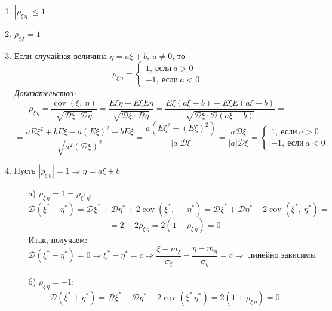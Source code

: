 \documentclass[12pt, a4paper]{article}
\begin{document}
    \begin{enumerate}
        \item $|\rho_{\xi\, \eta}| \leq 1$
        \item $\rho_{\xi\, \xi} = 1$
        \item Если случайная величина $\eta = a\xi + b,\ a\neq 0$, то
        \[\rho_{\xi\, \eta} = \begin{cases}
            1,\ \text{если}\ a > 0\\
            -1,\ \text{если}\ a < 0
        \end{cases}\]
        \textit{Доказательство:}
        \[\rho_{\xi\, \eta} = \frac{\operatorname{cov}(\xi,\ \eta)}{\sqrt{\mathcal{D}\xi\cdot \mathcal{D}\eta}} = \frac{E\xi\eta - E\xi E\eta}{\sqrt{\mathcal{D}\xi\cdot \mathcal{D}\eta}} = \frac{E\xi(a\xi + b) - E\xi E(a\xi + b)}{\sqrt{\mathcal{D}\xi\cdot \mathcal{D}(a\xi + b)}} =\]
        \[=\frac{aE\xi^2 + bE\xi - a(E\xi)^2 - bE\xi}{\sqrt{a^2(\mathcal{D}\xi)^2}} = \frac{a(E\xi^2 - (E\xi)^2)}{|a|\mathcal{D}\xi} = \frac{a\mathcal{D}\xi}{|a|\mathcal{D}\xi} = \begin{cases}
            1,\ \text{если}\ a > 0\\
            -1,\ \text{если}\ a < 0
        \end{cases}\]
        \item Пусть $|\rho_{\xi\, \eta}| = 1\Rightarrow \eta = a\xi + b$
        \begin{enumerate}
            \item[a)] $\rho_{\xi\, \eta} = 1 = \rho_{\xi^*\, \eta^*}$\\
            \[\mathcal{D}(\xi^* - \eta^*) = \mathcal{D}\xi^* + \mathcal{D}\eta^* + 2\operatorname{cov}(\xi^*,\ -\eta^*) = \mathcal{D}\xi^* + \mathcal{D}\eta^* - 2\operatorname{cov}(\xi^*,\ \eta^*) =\]
            \[= 2 - 2\rho_{\xi\, \eta} = 2(1 - \rho_{\xi\, \eta}) = 0\]
            Итак, получаем:
            \[\mathcal{D}(\xi^* - \eta^*) = 0 \Rightarrow \xi^* - \eta^* = c\Rightarrow \frac{\xi - m_{\xi}}{\sigma_{\xi}} - \frac{\eta - m_{\eta}}{\sigma_{\eta}} = c\Rightarrow \text{ линейно зависимы}\]
            \item[б)] $\rho_{\xi\, \eta} = -1$:
            \[\mathcal{D}(\xi^* + \eta^*) = \mathcal{D}\xi^* + \mathcal{D}\eta^* + 2\operatorname{cov}(\xi^*\, \eta^*) = 2(1 + \rho_{\xi\, \eta}) = 0\]
        \end{enumerate}
    \end{enumerate}
\end{document}
